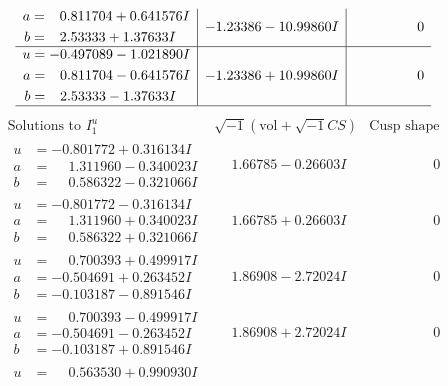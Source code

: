 \documentclass[1p]{elsarticle_modified}
\theoremstyle{definition}
\newcommand{\I}{\sqrt{-1}}
\begin{document}
$$\begin{array}{c|c|c}
\begin{aligned}
a &= \phantom{-}0.811704 + 0.641576 I \\
b &= \phantom{-}2.53333 + 1.37633 I\end{aligned}
 & -1.23386 - 10.99860 I & \phantom{-0.000000 } 0 \\ \hline\begin{aligned}
u &= -0.497089 - 1.021890 I \\
a &= \phantom{-}0.811704 - 0.641576 I \\
b &= \phantom{-}2.53333 - 1.37633 I\end{aligned}
 & -1.23386 + 10.99860 I & \phantom{-0.000000 } 0\\
 \hline 
 \end{array}$$\newpage$$\begin{array}{c|c|c}  
\text{Solutions to }I^u_{1}& \I (\text{vol} + \sqrt{-1}CS) & \text{Cusp shape}\\
 \hline 
\begin{aligned}
u &= -0.801772 + 0.316134 I \\
a &= \phantom{-}1.311960 - 0.340023 I \\
b &= \phantom{-}0.586322 - 0.321066 I\end{aligned}
 & \phantom{-}1.66785 - 0.26603 I & \phantom{-0.000000 } 0 \\ \hline\begin{aligned}
u &= -0.801772 - 0.316134 I \\
a &= \phantom{-}1.311960 + 0.340023 I \\
b &= \phantom{-}0.586322 + 0.321066 I\end{aligned}
 & \phantom{-}1.66785 + 0.26603 I & \phantom{-0.000000 } 0 \\ \hline\begin{aligned}
u &= \phantom{-}0.700393 + 0.499917 I \\
a &= -0.504691 + 0.263452 I \\
b &= -0.103187 - 0.891546 I\end{aligned}
 & \phantom{-}1.86908 - 2.72024 I & \phantom{-0.000000 } 0 \\ \hline\begin{aligned}
u &= \phantom{-}0.700393 - 0.499917 I \\
a &= -0.504691 - 0.263452 I \\
b &= -0.103187 + 0.891546 I\end{aligned}
 & \phantom{-}1.86908 + 2.72024 I & \phantom{-0.000000 } 0 \\ \hline\begin{aligned}
u &= \phantom{-}0.563530 + 0.990930 I \\

\end{aligned}
\end{array}$$
\end{document}
